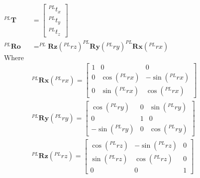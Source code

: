 \begin{equation}
    \label{eqn:simulate_position}
    \begin{aligned}
    ^{PL}\boldsymbol{T} &= 
    \left[\begin{array}{c}
        ^{PL}t_x \\^{PL}t_y\\^{PL}t_z
    \end{array}\right]\\
    ^{PL}\boldsymbol{Ro} &= 
    ^{PL}\boldsymbol{Rz} (^{PL}rz)^{PL}\boldsymbol{Ry}(^{PL}ry) ^{PL}\boldsymbol{Rx} (^{PL}rx)\\
    \text{Where }&\\
    &^{PL}\boldsymbol{Rx} (^{PL}rx) =
    \left[ \begin{array}{ccc}
        1&0&0\\
        0&\cos (^{PL}rx) &-\sin (^{PL}rx) \\
        0&\sin (^{PL}rx) &\cos (^{PL}rx) 
    \end{array}\right] \\
    &^{PL}\boldsymbol{Ry}(^{PL}ry)=
    \left[ \begin{array}{ccc}
        \cos (^{PL}ry) &0&\sin (^{PL}ry) \\
        0&1&0\\
        -\sin (^{PL}ry) &0&\cos (^{PL}ry)
    \end{array}\right]\\
    &^{PL}\boldsymbol{Rz} (^{PL}rz) = 
    \left[ \begin{array}{ccc}
        \cos (^{PL}rz) &-\sin (^{PL}rz)& 0 \\
        \sin (^{PL}rz) &\cos (^{PL}rz)& 0 \\
        0 &0&1
    \end{array}\right]\\
    \end{aligned}
\end{equation}

